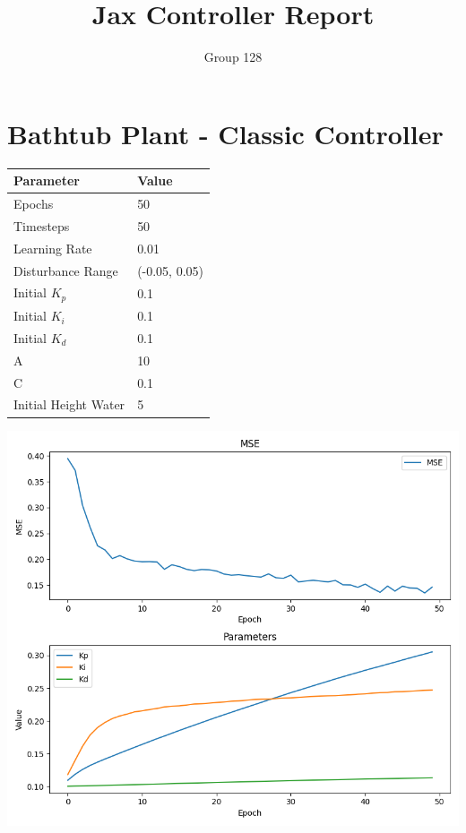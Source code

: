 \documentclass[12pt]{article}
\title{Jax Controller Report}
\author{Group 128}
\date{}
\begin{document}
\maketitle

\section*{Bathtub Plant - Classic Controller}

\begin{tabular}{|l|l|}
\hline
\textbf{Parameter}   & \textbf{Value}\\ \hline
Epochs               & 50            \\ \hline
Timesteps            & 50            \\ \hline
Learning Rate        & 0.01          \\ \hline
Disturbance Range    & (-0.05, 0.05) \\ \hline
Initial $K_p$           & 0.1           \\ \hline
Initial $K_i$           & 0.1           \\ \hline
Initial $K_d$           & 0.1           \\ \hline
A                    & 10            \\ \hline
C                    & 0.1           \\ \hline
Initial Height Water & 5             \\ \hline
\end{tabular}

\begin{center}
    \includegraphics[width=0.8\linewidth]{figures/bathtub-classic.png}
\end{center}
\end{document}
